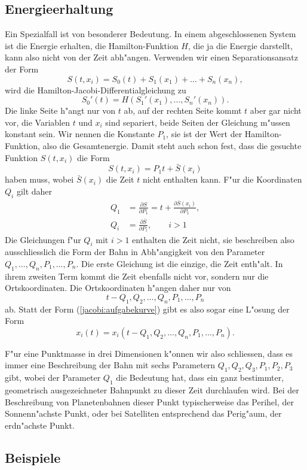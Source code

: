 \subsection{Energieerhaltung}
Ein Spezialfall ist von besonderer Bedeutung. In einem abgeschlossenen
System ist die Energie erhalten, die Hamilton-Funktion $H$, die ja
die Energie darstellt, kann also nicht von der Zeit abh"angen.
Verwenden wir einen Separationsansatz der Form 
\[
S(t,x_i)=S_0(t)+S_1(x_1)+\dots+S_n(x_n),
\]
wird die Hamilton-Jacobi-Differentialgleichung zu
\[
S_0'(t)=H(S_1'(x_1),\dots, S_n'(x_n)).
\]
Die linke Seite h"angt nur von $t$ ab, auf der rechten Seite
kommt $t$ aber gar nicht vor, die Variablen $t$ und $x_i$ sind
separiert, beide Seiten der Gleichung m"ussen konstant sein.
Wir nennen die Konstante $P_1$, sie ist der Wert der Hamilton-Funktion,
also die Gesamtenergie.
Damit steht auch schon fest, dass die gesuchte Funktion $S(t, x_i)$
die Form
\[
S(t,x_i)=P_1t + \bar S(x_i)
\]
haben muss, wobei $\bar S(x_i)$ die Zeit $t$ nicht enthalten kann.
F"ur die Koordinaten $Q_i$ gilt daher
\begin{align*}
Q_1&=\frac{\partial S}{\partial P_1}=t+\frac{\partial \bar S(x_i)}{\partial P_1},
\\
Q_i&=\frac{\partial \bar S}{\partial P_i},\qquad i>1
\end{align*}
Die Gleichungen f"ur $Q_i$ mit $i>1$ enthalten die Zeit nicht, sie
beschreiben also ausschliesslich die Form der Bahn in Abh"angigkeit
von den Parameter $Q_1,\dots,Q_n,P_1,\dots,P_n$. Die erste
Gleichung ist die einzige, die Zeit enth"alt. In ihrem zweiten
Term kommt die Zeit ebenfalls nicht vor, sondern nur die Ortskoordinaten.
Die Ortskoordinaten h"angen daher nur von
\[
t-Q_1,Q_2,\dots,Q_n, P_1,\dots,P_n
\]
ab. Statt der Form (\ref{jacobi:aufgabekurve}) gibt es also sogar eine
L"osung der Form
\[
x_i(t)=x_i(t-Q_1,Q_2, \dots,Q_n,P_1,\dots,P_n).
\]

F"ur eine Punktmasse in drei Dimensionen k"onnen wir also schliessen, 
dass es immer eine Beschreibung der Bahn mit sechs Parametern
$Q_1,Q_2,Q_3,P_1,P_2,P_3$ gibt, wobei der Parameter $Q_1$ die Bedeutung
hat, dass ein ganz bestimmter, geometrisch ausgezeichneter Bahnpunkt
zu dieser Zeit durchlaufen wird.
Bei der Beschreibung von Planetenbahnen dieser Punkt typischerweise
das Perihel, der Sonnenn"achste Punkt, oder bei Satelliten entsprechend
das Perig"aum, der erdn"achste Punkt.

\subsection{Beispiele}

